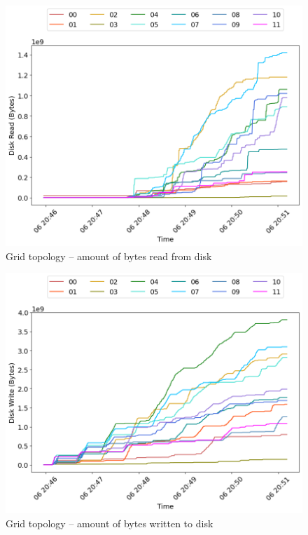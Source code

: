 \begin{minipage}{0.5\linewidth}
\begin{figure}[H]
\captionsetup{justification=centering,width=0.8\linewidth}
\includegraphics[width=\linewidth]{figures/grid/blk_read.png}
\caption{Grid topology -- amount of bytes read from disk}
\label{fig:grid-net_read}
\end{figure}
\end{minipage}
\begin{minipage}{0.5\linewidth}
\begin{figure}[H]
\captionsetup{justification=centering,width=0.8\linewidth}
\includegraphics[width=\linewidth]{figures/grid/blk_write.png}
\caption{Grid topology -- amount of bytes written to disk}
\label{fig:grid-net_write}
\end{figure}
\end{minipage}


